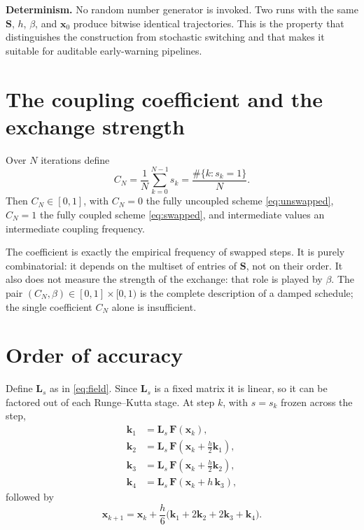 \documentclass[12pt, a4paper]{article}
\theoremstyle{plain}
\theoremstyle{definition}
\theoremstyle{remark}
\newcommand{\bx}{\mathbf{x}}
\newcommand{\bF}{\mathbf{F}}
\newcommand{\bk}{\mathbf{k}}
\newcommand{\bS}{\mathbf{S}}
\newcommand{\bL}{\mathbf{L}}
\begin{document}
\noindent
\textbf{Determinism.} No random number generator is invoked. Two runs with
the same $\bS$, $h$, $\beta$, and $\bx_0$ produce bitwise identical
trajectories. This is the property that distinguishes the construction from
stochastic switching and that makes it suitable for auditable early-warning
pipelines.

\section{The coupling coefficient and the exchange strength}
\label{sec:coupling}

Over $N$ iterations define
\begin{equation}
\boxed{\;C_N = \frac{1}{N}\sum_{k=0}^{N-1} s_k
= \frac{\#\{k : s_k = 1\}}{N}.\;}
\label{eq:coupling}
\end{equation}
Then $C_N \in [0,1]$, with $C_N = 0$ the fully uncoupled scheme
\eqref{eq:unswapped}, $C_N = 1$ the fully coupled scheme \eqref{eq:swapped},
and intermediate values an intermediate coupling frequency.

The coefficient is exactly the empirical frequency of swapped steps. It is
purely combinatorial: it depends on the multiset of entries of $\bS$, not on
their order. It also does not measure the strength of the exchange: that role
is played by $\beta$. The pair $(C_N, \beta) \in [0,1] \times [0,1)$ is the
complete description of a damped schedule; the single coefficient $C_N$ alone
is insufficient.

\section{Order of accuracy}
\label{sec:rk}

Define $\bL_s$ as in \eqref{eq:field}. Since $\bL_s$ is a fixed matrix it is
linear, so it can be factored out of each Runge--Kutta stage. At step $k$,
with $s = s_k$ frozen across the step,
\begin{equation}
\begin{aligned}
\bk_1 &= \bL_s\,\bF(\bx_k), \\
\bk_2 &= \bL_s\,\bF\!\left(\bx_k + \tfrac{h}{2}\bk_1\right), \\
\bk_3 &= \bL_s\,\bF\!\left(\bx_k + \tfrac{h}{2}\bk_2\right), \\
\bk_4 &= \bL_s\,\bF\!\left(\bx_k + h\,\bk_3\right),
\end{aligned}
\label{eq:rk4stages}
\end{equation}
followed by
\begin{equation}
\bx_{k+1} = \bx_k + \frac{h}{6}\big(\bk_1 + 2\bk_2 + 2\bk_3 + \bk_4\big).
\label{eq:rk4update}
\end{equation}
\end{document}
